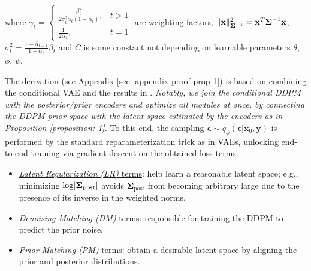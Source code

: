 \begin{proposition}[RestoreGrad]
\begin{equation}
\begin{aligned}
    \end{aligned}
    \label{eq: elbo for restoregrad}
    \end{equation}
    where $\gamma_t= \begin{cases} \frac{\beta_t^2}{2\sigma_t^2\alpha_t(1-\bar{\alpha}_t)}, & t>1 \\ \frac{1}{2\alpha_1}, & t=1\end{cases}$ are weighting factors, $\lVert\mathbf{x}\rVert^2_{\boldsymbol{\Sigma}^{-1}}=\mathbf{x}^T\boldsymbol{\Sigma}^{-1}\mathbf{x}$, $\sigma_t^2=\frac{1-\bar{\alpha}_{t-1}}{1-\bar{\alpha_t}}\beta_t$ and $C$ is some constant not depending on learnable parameters $\theta$, $\phi$, $\psi$.
\label{proposition: 2}
\end{proposition}

The derivation (see Appendix \ref{sec: appendix proof prop 1}) is based on combining the conditional VAE and the results in \citet{lee2021priorgrad}. \textit{Notably, we join the conditional DDPM with the posterior/prior encoders and optimize all modules at once, by connecting the DDPM prior space with the latent space estimated by the encoders as in Proposition \ref{proposition: 1}.}
To this end, the sampling $\boldsymbol{\epsilon}\sim q_{\phi}(\boldsymbol{\epsilon}|\mathbf{x}_0, \mathbf{y})$ is performed by the standard reparameterization trick as in VAEs, unlocking end-to-end training via gradient descent on the obtained loss terms:
\begin{itemize}[leftmargin=*]
\vspace{-0.15cm}
    \item \underline{\textit{Latent Regularization (LR)} terms}: help learn a reasonable latent space; e.g., minimizing $\log\lvert\boldsymbol{\Sigma}_{\text{post}}\rvert$ avoids $\boldsymbol{\Sigma}_{\text{post}}$ from becoming arbitrary large due to the presence of its inverse in the weighted norms.
    \vspace{-0.1cm}
    \item \underline{\textit{Denoising Matching (DM)} terms}: responsible for training the DDPM to predict the prior noise.
    \vspace{-0.1cm}
    \item \underline{\textit{Prior Matching (PM)} terms}: obtain a desirable latent space by aligning the prior and posterior distributions.
\end{itemize}

